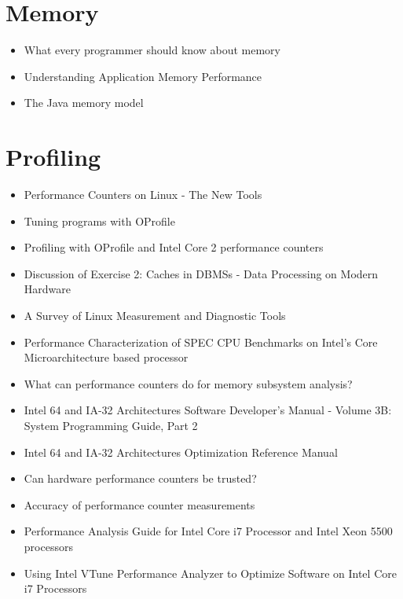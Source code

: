 \section*{Memory}
\label{sec:lr-memory}

\begin{itemize}
\item What every programmer should know about memory
  \cite{Drepper2007}
\item Understanding Application Memory Performance \cite{Drepper2008}
\item The Java memory model \cite{Manson2005}
\end{itemize}


\section*{Profiling}
\label{sec:lr-profiling}

\begin{itemize}
\item Performance Counters on Linux - The New Tools \cite{Melo2009}
\item Tuning programs with OProfile \cite{Cohen2004}
\item Profiling with OProfile and Intel Core 2 performance counters
  \cite{Nielsen2008}
\item Discussion of Exercise 2: Caches in DBMSs - Data Processing on
  Modern Hardware \cite{Muller2009}
\item A Survey of Linux Measurement and Diagnostic Tools
  \cite{Rowand2009}
\item Performance Characterization of SPEC CPU Benchmarks on Intel's
  Core Microarchitecture based processor \cite{Bird2007}
\item What can performance counters do for memory subsystem analysis?
  \cite{Eranian2008}
\item Intel \textsuperscript{\textregistered} 64 and IA-32
  Architectures Software Developer’s Manual - Volume 3B: System
  Programming Guide, Part 2 \cite{Intel2010}
\item Intel \textsuperscript{\textregistered} 64 and IA-32
  Architectures Optimization Reference Manual \cite{Intel2009}
\item Can hardware performance counters be trusted? \cite{Weaver2008}
\item Accuracy of performance counter measurements
  \cite{Zaparanuks2008}
\item Performance Analysis Guide for Intel
  \textsuperscript{\textregistered} Core
  \textsuperscript{\texttrademark} i7 Processor and Intel
  \textsuperscript{\textregistered} Xeon
  \textsuperscript{\texttrademark} 5500 processors
  \cite{Levinthal2009}
\item Using Intel \textsuperscript{\textregistered} VTune
  \textsuperscript{\texttrademark} Performance Analyzer to Optimize
  Software on Intel \textsuperscript{\textregistered} Core
  \textsuperscript{\texttrademark} i7 Processors \cite{Intel2009a}
\end{itemize}


